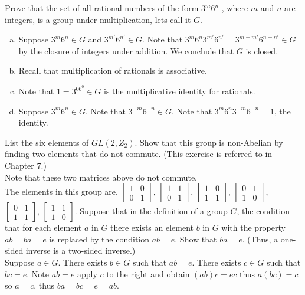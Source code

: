 \documentclass[12pt]{article}
\makeatletter
\theoremstyle{homework}
\newenvironment{exercise}[1]
{\def\@currentlabel{#1}\exercisecore}
{\endexercisecore}
\makeatother
\begin{document}
\begin{exercise}
{2.46}
Prove that the set of all rational numbers of the form $3^m 6^n$ , where $m$ and $n$ are integers, is a group under multiplication, lets call it $G$.
\begin{enumerate}[(a)]
\item
Suppose $3^m 6^n\in G$ and $3^{m'} 6^{n'}\in G$.  Note that $3^m 6^n3^{m'} 6^{n'}=3^{m+m'} 6^{n+n'}\in G$ by the closure of integers under addition.  We conclude that $G$ is closed.
\item
Recall that multiplication of rationals is associative.
\item
Note that $1=3^06^0\in G$ is the multiplicative identity for rationals.
\item
Suppose $3^m 6^n\in G$.  Note that $3^{-m} 6^{-n}\in G$.  Note that $3^m 6^n3^{-m} 6^{-n}=1$, the identity.
\end{enumerate}
\end{exercise}
\begin{exercise}
{2.51}
List the six elements of $GL(2, Z_2 )$. Show that this group is non-Abelian by finding two elements that do not commute. (This exercise is referred to in Chapter 7.)\\

Note that these two matrices above do not commute.\\
The elements in this group are, 
$\begin{bmatrix}
1&0\\0&1
\end{bmatrix}$, 
$\begin{bmatrix}
1&1\\0&1
\end{bmatrix}$, 
$\begin{bmatrix}
1&0\\1&1
\end{bmatrix}$, 
$\begin{bmatrix}
0&1\\1&0
\end{bmatrix}$, 
$\begin{bmatrix}
0&1\\1&1
\end{bmatrix}$, 
$\begin{bmatrix}
1&1\\1&0
\end{bmatrix}$.
\end{exercise}
\begin{exercise}
{2.54}
Suppose that in the definition of a group $G$, the condition that for each element $a$ in $G$ there exists an element $b$ in $G$ with the property $ab = ba = e$ is replaced by the condition $ab = e$. Show that $ba = e$. (Thus, a one-sided inverse is a two-sided inverse.)\\
Suppose $a\in G$.  There exists $b\in G$ such that $ab=e$.  There exists $c\in G$ such that $bc=e$.  Note $ab=e$ apply $c$ to the right and obtain $(ab)c=ec$ thus $a(bc)=c$ so $a=c$, thus $ba=bc=e=ab$.
\end{exercise}
\end{document}
